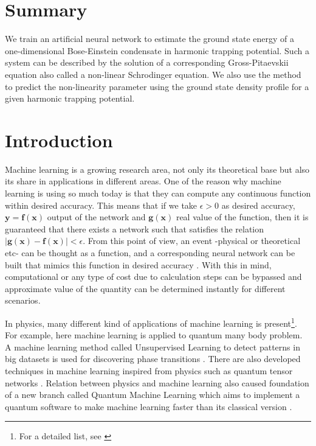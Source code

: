 \documentclass[a4paper,times,12pt]{article}
\begin{document}
\section*{Summary}

We train an artificial neural network to estimate the ground state energy
of a one-dimensional Bose-Einstein condensate in harmonic trapping potential.
Such a system can be described by the solution of a corresponding
Gross-Pitaevskii equation also called a non-linear Schrodinger equation.
We also use the method to predict the non-linearity parameter using the ground
state density profile for a given harmonic trapping potential.

\newpage
\tableofcontents

\newpage

\section{Introduction}
\label{sec:Intro}

Machine learning is a growing research area, not only its theoretical base but also its share in applications in different areas. One of the reason why machine learning is using so much today is that they can compute any continuous function within desired accuracy. This means that if we take $\epsilon > 0$ as desired accuracy,  $\boldsymbol{y} = \boldsymbol{f}(\boldsymbol{x})$ output of the network and $\boldsymbol{g}(\boldsymbol{x})$ real value of the function, then it is guaranteed that there exists a network such that satisfies the relation $|\boldsymbol{g}(\boldsymbol{x}) - \boldsymbol{f}(\boldsymbol{x})| < \epsilon $. From this point of view, an event -physical or theoretical etc- can be thought as a function, and a corresponding neural network can be built that mimics this function in desired accuracy \cite{nielsen2015neural}. With this in mind, computational or any type of cost due to calculation steps can be bypassed and approximate value of the quantity can be determined instantly for different scenarios.

In physics, many different kind of applications of machine learning is present\footnote{For a detailed list, see \cite{physicsml}}. For example, here \cite{carleo2017solving, cai2017approximating} machine learning is applied to quantum many body problem. A machine learning method called Unsupervised Learning to detect patterns in big datasets is used for discovering phase transitions \cite{wang2016discovering}. There are also developed techniques in machine learning inspired from physics such as quantum tensor networks \cite{stoudenmire2016supervised}. Relation between physics and machine learning also caused foundation of a new branch called Quantum Machine Learning which aims to implement a quantum software to make machine learning faster than its classical version \cite{biamonte1611quantum}. 
\end{document}
